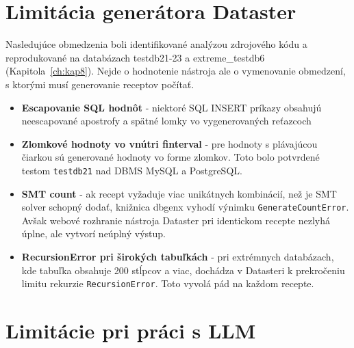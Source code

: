 \section{Limitácia generátora Dataster}
\label{sub:limitacia_generatora_dataster}

Nasledujúce obmedzenia boli identifikované analýzou zdrojového kódu a reprodukované na databázach testdb21-23 a extreme\_testdb6 (Kapitola~\ref{ch:kap8}). Nejde o hodnotenie nástroja ale o vymenovanie obmedzení, s ktorými musí generovanie receptov počítať.

\begin{itemize}
    \item \textbf{Escapovanie SQL hodnôt} - niektoré SQL INSERT príkazy obsahujú neescapované apostrofy a spätné lomky vo vygenerovaných reťazcoch
    \item \textbf{Zlomkové hodnoty vo vnútri finterval} - pre hodnoty s plávajúcou čiarkou sú generované hodnoty vo forme zlomkov. Toto bolo potvrdené testom \texttt{testdb21} nad DBMS MySQL a PostgreSQL.
    
    \item \textbf{SMT count} - ak recept vyžaduje viac unikátnych kombinácií, než je SMT solver schopný dodať, knižnica dbgenx vyhodí výnimku \texttt{GenerateCountError}. Avšak webové rozhranie nástroja Dataster pri identickom recepte nezlyhá úplne, ale vytvorí neúplný výstup.

    \item \textbf{RecursionError pri širokých tabuľkách} - pri extrémnych databázach, kde tabuľka obsahuje 200 stĺpcov a viac, dochádza v Datasteri k prekročeniu limitu rekurzie \texttt{RecursionError}. Toto vyvolá pád na každom recepte.

\end{itemize}


\section{Limitácie pri práci s LLM}
\label{sub:limitacia_pri_praci_s_llm}

